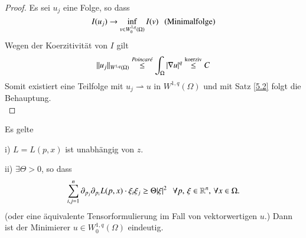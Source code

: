 \begin{proof}
    Es sei $u_j$ eine Folge, so dass 
    \[
        I(u_j)\rightarrow \inf_{v\in W_0^{1,q}(\Omega)} I(v) \hspace{.25cm} (\text{Minimalfolge})
    \]
    Wegen der Koerzitivität von $I$ gilt 
    \[
        \|u_j\|_{W^{1,q}(\Omega)}\overset{\text{\textit{Poincaré}}}{\leq} \int_\Omega |\nabla u|^q
        \overset{\text{koerziv}}{\leq} C
    \]
    Somit existiert eine Teilfolge mit $u_j\rightharpoonup u$ in $W^{1,q}(\Omega)$ und mit Satz
    \ref{5.2} folgt die Behauptung. \[ \]
\end{proof}

\begin{theorem}\label{5.4}
    Es gelte
    \begin{description}
    \item{i)}
    $L=L(p,x)$ ist unabhängig von $z$.
    \item{ii)}
    $\exists \Theta > 0$, so dass
    \[
        \sum_{i,j=1}^n\partial_{p_j}\partial_{p_i} L(p,x) \cdot \xi_i\xi_j\geq \Theta |\xi|^2
        \hspace{.25cm} \forall p,\, \xi \in \mathbb{R}^n, \,\forall x\in \Omega.
    \]
    (oder eine äquivalente Tensorformulierung im Fall von vektorwertigen $u$.)
    Dann ist der Minimierer $u\in W_0^{1,q}(\Omega)$ eindeutig.
    \end{description}
\end{theorem}

